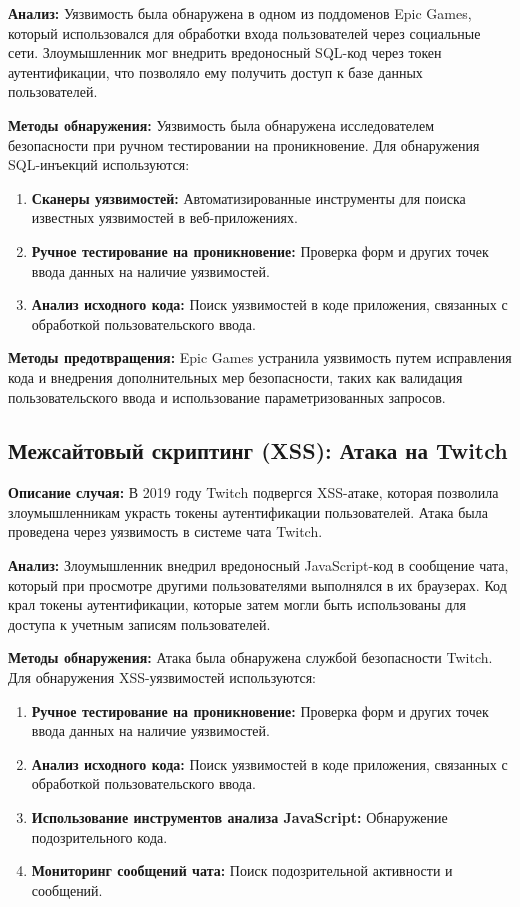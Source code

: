 \documentclass[a4paper,12pt]{diplom}
\begin{document}
	 \textbf{Анализ:} Уязвимость была обнаружена в одном из поддоменов Epic Games, который использовался для обработки входа пользователей через социальные сети.  Злоумышленник мог внедрить вредоносный SQL-код через токен аутентификации, что позволяло ему получить доступ к базе данных пользователей.
	 
	 \textbf{Методы обнаружения:} Уязвимость была обнаружена исследователем безопасности при ручном тестировании на проникновение. Для обнаружения SQL-инъекций используются:
	 
	 \begin{enumerate}[label=\arabic{enumi})]
	 	\item \textbf{Сканеры уязвимостей:} Автоматизированные инструменты для поиска известных уязвимостей в веб-приложениях.
	 	\item \textbf{Ручное тестирование на проникновение:} Проверка форм и других точек ввода данных на наличие уязвимостей.
	 	\item \textbf{Анализ исходного кода:} Поиск уязвимостей в коде приложения, связанных с обработкой пользовательского ввода.
	 \end{enumerate}
	 
	 \textbf{Методы предотвращения:} Epic Games устранила уязвимость путем исправления кода и внедрения дополнительных мер безопасности, таких как валидация пользовательского ввода и использование параметризованных запросов.
	 
	 \subsection{Межсайтовый скриптинг (XSS): Атака на Twitch}
	 
	 \textbf{Описание случая:} В 2019 году Twitch подвергся XSS-атаке, которая позволила злоумышленникам украсть токены аутентификации пользователей.  Атака была проведена через уязвимость в системе чата Twitch.
	 
	 \textbf{Анализ:} Злоумышленник внедрил вредоносный JavaScript-код в сообщение чата, который при просмотре другими пользователями выполнялся в их браузерах.  Код крал токены аутентификации, которые затем могли быть использованы для доступа к учетным записям пользователей. 
	 
	 \textbf{Методы обнаружения:} Атака была обнаружена службой безопасности Twitch. Для обнаружения XSS-уязвимостей используются:
	 
	 \begin{enumerate}[label=\arabic{enumi})]
	 	\item \textbf{Ручное тестирование на проникновение:} Проверка форм и других точек ввода данных на наличие уязвимостей.
	 	\item \textbf{Анализ исходного кода:} Поиск уязвимостей в коде приложения, связанных с обработкой пользовательского ввода.
	 	\item \textbf{Использование инструментов анализа JavaScript:} Обнаружение подозрительного кода.
	 	\item \textbf{Мониторинг сообщений чата:}  Поиск подозрительной активности и сообщений.
	 \end{enumerate}
	 
\end{document}
